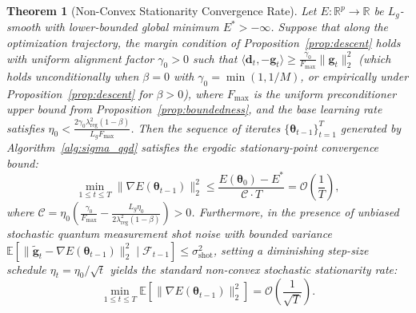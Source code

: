 \documentclass[11pt,a4paper]{article}
\newtheorem{theorem}{Theorem}
\begin{document}
\begin{theorem}[Non-Convex Stationarity Convergence Rate]
\label{thm:convergence}
Let $E: \mathbb{R}^p \to \mathbb{R}$ be $L_g$-smooth with lower-bounded global minimum $E^* > -\infty$. Suppose that along the optimization trajectory, the margin condition of Proposition~\ref{prop:descent} holds with uniform alignment factor $\gamma_0 > 0$ such that $\langle \mathbf{d}_t, -\mathbf{g}_t \rangle \ge \frac{\gamma_0}{F_{\max}} \|\mathbf{g}_t\|_2^2$ (which holds unconditionally when $\beta = 0$ with $\gamma_0 = \min(1, 1/M)$, or empirically under Proposition~\ref{prop:descent} for $\beta > 0$), where $F_{\max}$ is the uniform preconditioner upper bound from Proposition~\ref{prop:boundedness}, and the base learning rate satisfies $\eta_0 < \frac{2 \gamma_0 \lambda_{\text{reg}}^2 (1-\beta)}{L_g F_{\max}}$. Then the sequence of iterates $\{\boldsymbol{\theta}_{t-1}\}_{t=1}^T$ generated by Algorithm~\ref{alg:sigma_qgd} satisfies the ergodic stationary-point convergence bound:
\begin{equation}
\min_{1 \le t \le T} \|\nabla E(\boldsymbol{\theta}_{t-1})\|_2^2 \le \frac{E(\boldsymbol{\theta}_0) - E^*}{\mathcal{C} \cdot T} = \mathcal{O}\left(\frac{1}{T}\right),
\label{eq:ergodic_rate}
\end{equation}
where $\mathcal{C} = \eta_0 \left( \frac{\gamma_0}{F_{\max}} - \frac{L_g \eta_0}{2 \lambda_{\text{reg}}^2 (1-\beta)} \right) > 0$. Furthermore, in the presence of unbiased stochastic quantum measurement shot noise with bounded variance $\mathbb{E}[\|\tilde{\mathbf{g}}_t - \nabla E(\boldsymbol{\theta}_{t-1})\|_2^2 \mid \mathcal{F}_{t-1}] \le \sigma_{\text{shot}}^2$, setting a diminishing step-size schedule $\eta_t = \eta_0 / \sqrt{t}$ yields the standard non-convex stochastic stationarity rate:
\begin{equation}
\min_{1 \le t \le T} \mathbb{E}\left[\|\nabla E(\boldsymbol{\theta}_{t-1})\|_2^2\right] = \mathcal{O}\left(\frac{1}{\sqrt{T}}\right).
\label{eq:stochastic_rate}
\end{equation}
\end{theorem}
\end{document}
